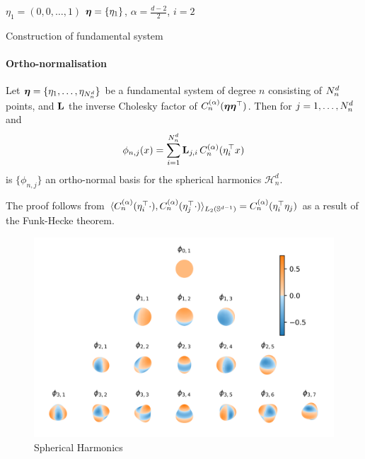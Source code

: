\begin{algorithm}[H]
    \SetAlgoLined
    \DontPrintSemicolon
    $\eta_1 = (0,0,\ldots,1)$ 
    $\boldsymbol{\eta} = \{\eta_1\}$,
    $\alpha = \frac{d-2}{2}$,
    $i = 2$\;
     \caption{Construction of fundamental system\label{alg:fundamental-system}}
\end{algorithm}

\paragraph{Ortho-normalisation}

\begin{theorem}
   Let $\boldsymbol{\eta} = \{\eta_1, \ldots, \eta_{N^d_n}\}$ be a fundamental system of degree $n$ consisting of $N^d_n$ points, and $\mathbf{{L}}$ the inverse Cholesky factor of $C_n^{(\alpha)}(\boldsymbol{\eta}\boldsymbol{\eta}^{\top})$. Then for $j=1,\ldots,N^d_n$ and
    \begin{equation}
    \phi_{n,j}(x) = \sum_{i=1}^{N^d_n} \mathbf{{L}}_{j,i}\,C_n^{(\alpha)}(\eta_i^{\top} x)
    \end{equation}
    is $\{\phi_{n,j}\}$ an ortho-normal basis for the spherical harmonics $\mathcal{H}_n^d$.
\end{theorem}

The proof follows from $\langle C_n^{(\alpha)}(\eta_i^{\top} \cdot), C_n^{(\alpha)}(\eta_j^{\top} \cdot) \rangle_{L_2(\mathbb{S}^{d-1})} = C_n^{(\alpha)}(\eta_i^{\top}\eta_j)$ as a result of the Funk-Hecke theorem.


\begin{figure}
    \centering
    \includegraphics[width=.6\linewidth]{Appendix1/harmonics}
    \caption{Spherical Harmonics}
    \label{fig:appendix:harmonics}
\end{figure}